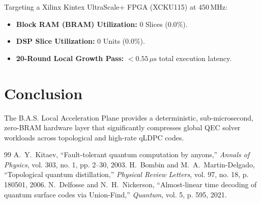 \documentclass[10pt,journal,compsoc]{IEEEtran}
\begin{document}
Targeting a Xilinx Kintex UltraScale+ FPGA (XCKU115) at $450\,\text{MHz}$:
\begin{itemize}
    \item \textbf{Block RAM (BRAM) Utilization:} 0 Slices ($0.0\%$).
    \item \textbf{DSP Slice Utilization:} 0 Units ($0.0\%$).
    \item \textbf{20-Round Local Growth Pass:} $< 0.55\,\mu\text{s}$ total execution latency.
\end{itemize}

\section{Conclusion}
The B.A.S. Local Acceleration Plane provides a deterministic, sub-microsecond, zero-BRAM hardware layer that significantly compresses global QEC solver workloads across topological and high-rate qLDPC codes.

\begin{thebibliography}{99}
 A.~Y.~Kitaev, ``Fault-tolerant quantum computation by anyons,'' \emph{Annals of Physics}, vol. 303, no. 1, pp. 2--30, 2003.
 H.~Bombin and M.~A.~Martin-Delgado, ``Topological quantum distillation,'' \emph{Physical Review Letters}, vol. 97, no. 18, p. 180501, 2006.
 N.~Delfosse and N.~H.~Nickerson, ``Almost-linear time decoding of quantum surface codes via Union-Find,'' \emph{Quantum}, vol. 5, p. 595, 2021.
\end{thebibliography}
\end{document}
